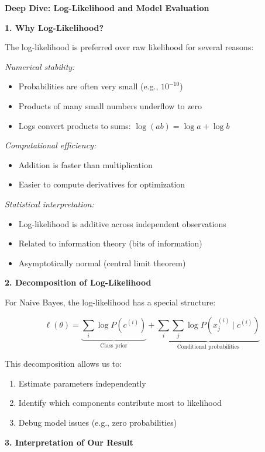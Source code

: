 \documentclass[12pt]{article}
\begin{document}
\begin{explanation}
\textbf{Deep Dive: Log-Likelihood and Model Evaluation}

\textbf{1. Why Log-Likelihood?}

The log-likelihood is preferred over raw likelihood for several reasons:

\textit{Numerical stability:}
\begin{itemize}
    \item Probabilities are often very small (e.g., $10^{-10}$)
    \item Products of many small numbers underflow to zero
    \item Logs convert products to sums: $\log(ab) = \log a + \log b$
\end{itemize}

\textit{Computational efficiency:}
\begin{itemize}
    \item Addition is faster than multiplication
    \item Easier to compute derivatives for optimization
\end{itemize}

\textit{Statistical interpretation:}
\begin{itemize}
    \item Log-likelihood is additive across independent observations
    \item Related to information theory (bits of information)
    \item Asymptotically normal (central limit theorem)
\end{itemize}

\textbf{2. Decomposition of Log-Likelihood}

For Naive Bayes, the log-likelihood has a special structure:

\[
\ell(\theta) = \underbrace{\sum_i \log P(c^{(i)})}_{\text{Class prior}} + \underbrace{\sum_i \sum_j \log P(x_j^{(i)} \mid c^{(i)})}_{\text{Conditional probabilities}}
\]

This decomposition allows us to:
\begin{enumerate}
    \item Estimate parameters independently
    \item Identify which components contribute most to likelihood
    \item Debug model issues (e.g., zero probabilities)
\end{enumerate}

\textbf{3. Interpretation of Our Result}


\end{explanation}
\end{document}

